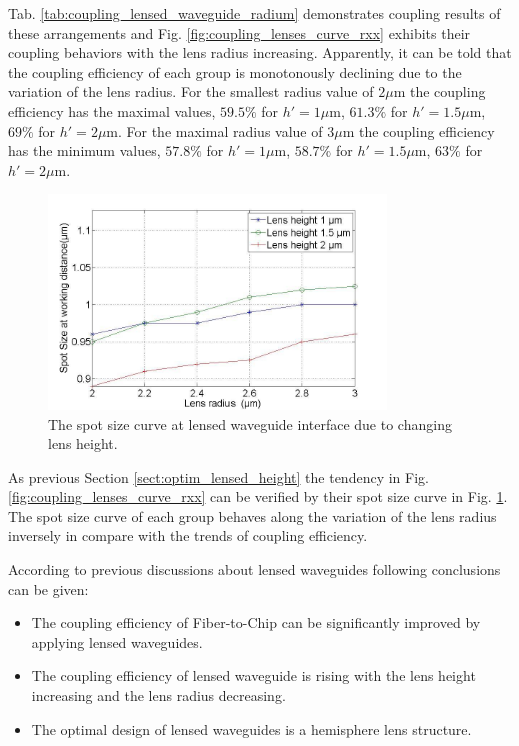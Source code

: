 Tab. \ref{tab:coupling_lensed_waveguide_radium} demonstrates coupling results of these arrangements and Fig. \ref{fig:coupling_lenses_curve_rxx} exhibits their coupling behaviors with the lens radius increasing. Apparently, it can be told that the coupling efficiency of each group is monotonously declining due to the variation of the lens radius. For the smallest radius value of $2\mu$m the coupling efficiency has the maximal values, $59.5\%$ for $h'=1\mu$m, $61.3\%$ for $h'=1.5\mu$m, $69\%$ for $h'=2\mu$m. For the maximal radius value of $3\mu$m the coupling efficiency has the minimum values, $57.8\%$ for $h'=1\mu$m, $58.7\%$ for $h'=1.5\mu$m, $63\%$ for $h'=2\mu$m.\\

\begin{figure}[!ht]
\centering
\includegraphics[width=0.8\textwidth]{bilder/spot_fix_lens_height_rxx}
\caption{The spot size curve at lensed waveguide interface due to changing lens height.}
\label{fig:lensed_guide_spot_size_curve_rxx}
\end{figure}
As previous Section \ref{sect:optim_lensed_height} the tendency in Fig. \ref{fig:coupling_lenses_curve_rxx} can be verified by their spot size curve in Fig. \ref{fig:lensed_guide_spot_size_curve_rxx}. The spot size curve of each group behaves along the variation of the lens radius inversely in compare with the trends of coupling efficiency. 

 According to previous discussions about lensed waveguides following conclusions can be given: 
\begin{itemize} 
\item The coupling efficiency of Fiber-to-Chip can be significantly improved by applying lensed waveguides.  
\item The coupling efficiency of lensed waveguide is rising with the lens height increasing and the lens radius decreasing.
\item The optimal design of lensed waveguides is a hemisphere lens structure. 
\end{itemize}
